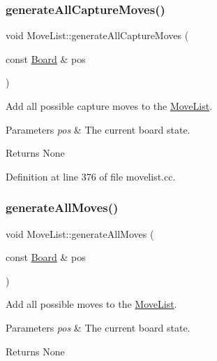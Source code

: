 \subsubsection{\texorpdfstring{generate\+All\+Capture\+Moves()}{generateAllCaptureMoves()}}
{\footnotesize\ttfamily void Move\+List\+::generate\+All\+Capture\+Moves (\begin{DoxyParamCaption}\item[{const \mbox{\hyperlink{classBoard}{Board}} \&}]{pos }\end{DoxyParamCaption})\hspace{0.3cm}{\ttfamily [noexcept]}}



Add all possible capture moves to the \mbox{\hyperlink{classMoveList}{Move\+List}}. 


\begin{DoxyParams}{Parameters}
{\em pos} & The current board state. \\
\hline
\end{DoxyParams}
\begin{DoxyReturn}{Returns}
None 
\end{DoxyReturn}


Definition at line 376 of file movelist.\+cc.

\mbox{\label{classMoveList_a6453c799251a6809fcf9312df1ad0814}} 
\subsubsection{\texorpdfstring{generate\+All\+Moves()}{generateAllMoves()}}
{\footnotesize\ttfamily void Move\+List\+::generate\+All\+Moves (\begin{DoxyParamCaption}\item[{const \mbox{\hyperlink{classBoard}{Board}} \&}]{pos }\end{DoxyParamCaption})\hspace{0.3cm}{\ttfamily [noexcept]}}



Add all possible moves to the \mbox{\hyperlink{classMoveList}{Move\+List}}. 


\begin{DoxyParams}{Parameters}
{\em pos} & The current board state. \\
\hline
\end{DoxyParams}
\begin{DoxyReturn}{Returns}
None 
\end{DoxyReturn}


